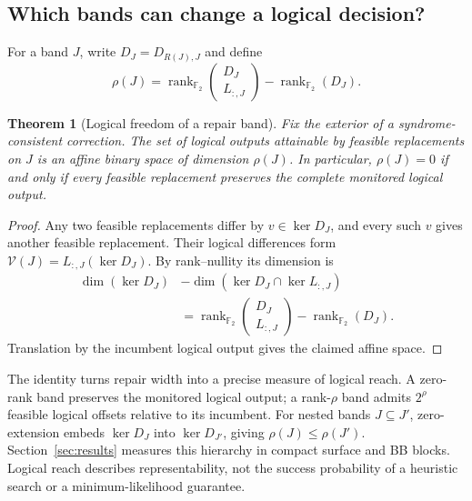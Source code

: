 \documentclass[10pt,letterpaper,twocolumn]{article}
\newtheorem{theorem}{Theorem}
\newcommand{\F}{\mathbb F_2}
\newcommand{\rank}{\operatorname{rank}_{\F}}
\newcommand{\reach}{\mathcal V}
\begin{document}
\subsection{Which bands can change a logical decision?}
For a band $J$, write $D_J=D_{R(J),J}$ and define
\begin{equation}\rho(J)=\rank\begin{pmatrix}D_J\\L_{:,J}\end{pmatrix}-\rank(D_J).\label{eq:rank}\end{equation}
\begin{theorem}[Logical freedom of a repair band]\label{thm:reach}
Fix the exterior of a syndrome-consistent correction. The set of logical outputs attainable by feasible replacements on $J$ is an affine binary space of dimension $\rho(J)$. In particular, $\rho(J)=0$ if and only if every feasible replacement preserves the complete monitored logical output.
\end{theorem}
\begin{proof}
Any two feasible replacements differ by $v\in\ker D_J$, and every such $v$ gives another feasible replacement. Their logical differences form $\reach(J)=L_{:,J}(\ker D_J)$. By rank--nullity its dimension is
\begin{align*}
\dim(\ker D_J)&-\dim(\ker D_J\cap\ker L_{:,J})\\
&=\rank\begin{pmatrix}D_J\\L_{:,J}\end{pmatrix}-\rank(D_J).
\end{align*}
Translation by the incumbent logical output gives the claimed affine space.
\end{proof}
The identity turns repair width into a precise measure of logical reach. A zero-rank band preserves the monitored logical output; a rank-$\rho$ band admits $2^\rho$ feasible logical offsets relative to its incumbent. For nested bands $J\subseteq J'$, zero-extension embeds $\ker D_J$ into $\ker D_{J'}$, giving $\rho(J)\le\rho(J')$. Section~\ref{sec:results} measures this hierarchy in compact surface and BB blocks. Logical reach describes representability, not the success probability of a heuristic search or a minimum-likelihood guarantee.
\end{document}
